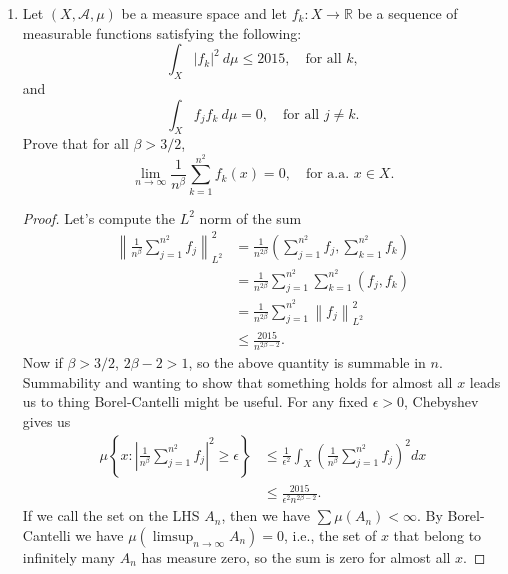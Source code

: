 \documentclass[11pt,letterpaper]{report}
\newcommand{\reals}{\mathbb{R}}
\newcommand{\mcal}[1]{\mathcal{#1}}
\newcommand{\Lp}[2]{\left\|{#1}\right\|_{L^{#2}}}
\begin{document}
\begin{enumerate}
	\item Let $(X, \mcal{A}, \mu)$ be a measure space and let $f_k: X\to \reals$ be a sequence of measurable functions satisfying the following:
	\[
	\int_X |f_k|^2\ d\mu\leq 2015,\quad \text{for all }k,
	\]
	and
	\[
	\int_X f_jf_k\ d\mu=0,\quad \text{for all }j\neq k.
	\]
	Prove that for all $\beta>3/2$,
	\[
	\lim_{n\to \infty}\frac{1}{n^\beta}\sum_{k=1}^{n^2}f_k(x) = 0,\quad \text{for a.a. } x\in X.
	\]
	\begin{proof}
		Let's compute the $L^2$ norm of the sum
		\begin{align*}
			\left\|\frac{1}{n^\beta}\sum_{j=1}^{n^2}f_j\right\|_{L^2}^2 &= \frac{1}{n^{2\beta}}\left(\sum_{j=1}^{n^2}f_j, \sum_{k=1}^{n^2}f_k\right)\\
			&= \frac{1}{n^{2\beta}}\sum_{j=1}^{n^2}\sum_{k=1}^{n^2}(f_j, f_k)\\
			&= \frac{1}{n^{2\beta}}\sum_{j=1}^{n^2}\Lp{f_j}{2}^2\\
			&\leq \frac{2015}{n^{2\beta-2}}.
		\end{align*}
		Now if $\beta>3/2$, $2\beta-2>1$, so the above quantity is summable in $n$. Summability and wanting to show that something holds for almost all $x$ leads us to thing Borel-Cantelli might be useful. For any fixed $\epsilon>0$, Chebyshev gives us
		\begin{align*}
			\mu\left\{x: \left|\frac{1}{n^\beta}\sum_{j=1}^{n^2}f_j\right|^2\geq\epsilon\right\} &\leq \frac{1}{\epsilon^2}\int_X \left(\frac{1}{n^\beta}\sum_{j=1}^{n^2}f_j\right)^2dx\\
			&\leq \frac{2015}{\epsilon^2n^{2\beta-2}}.
		\end{align*}
		If we call the set on the LHS $A_n$, then we have $\sum \mu(A_n)<\infty$. By Borel-Cantelli we have $\mu(\limsup_{n\to \infty}A_n) = 0$, i.e., the set of $x$ that belong to infinitely many $A_n$ has measure zero, so the sum is zero for almost all $x$.
	\end{proof}
\end{enumerate}
\end{document}

